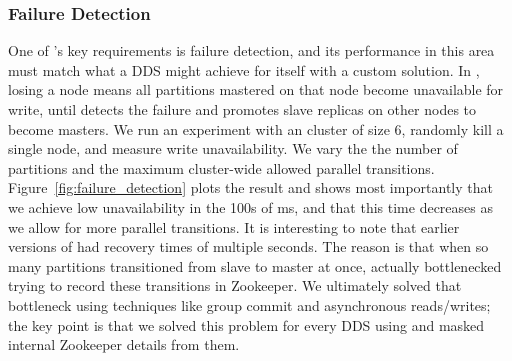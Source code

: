 \subsubsection{Failure Detection}
\label{sec:failuredetection}
%
One of \helix's key requirements is failure detection, and its performance in
this area must match what a DDS might achieve for itself with a custom solution.
In \ES, losing a node means all partitions mastered on that node become
unavailable for write, until \helix detects the failure and promotes slave
replicas on other nodes to become masters.
We run an experiment with an \ES cluster of size 6, randomly kill a single
node, and measure write unavailability.  We vary the the number
of \ES partitions and the maximum cluster-wide allowed parallel transitions.
Figure~\ref{fig:failure_detection} plots the result and shows most importantly
that we achieve low unavailability in the 100s of ms, and that this time decreases as we allow
for more parallel transitions.  It is interesting to note that earlier versions
of \helix had recovery times of multiple seconds.  The reason is that when so
many partitions transitioned from slave to master at once, \helix actually
bottlenecked trying to record these transitions in Zookeeper.  We ultimately
solved that bottleneck using techniques like group commit and asynchronous
reads/writes;  the key point is that we solved this problem for every DDS using \helix and masked
internal Zookeeper details from them.    

